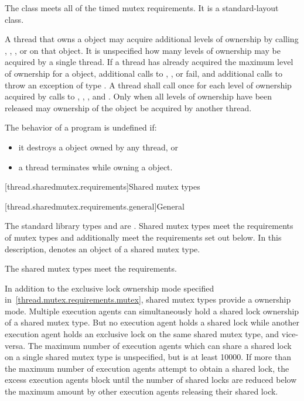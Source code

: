\pnum
The class  meets
all of the timed mutex requirements.
It is a standard-layout class.

\pnum
A thread that owns a  object may acquire additional
levels of ownership by calling , ,
, or  on that object. It is
unspecified how many levels of ownership may be acquired by a single thread. If
a thread has already acquired the maximum level of ownership for a
 object, additional calls to ,
, or  fail, and additional
calls to  throw an exception of type . A
thread shall call  once for each level of ownership acquired by
calls to , , , and
. Only when all levels of ownership have been released
may ownership of the object be acquired by another thread.

\pnum
The behavior of a program is undefined if:
\begin{itemize}
\item it destroys a  object owned by any thread, or
\item a thread terminates while owning a  object.
\end{itemize}


[thread.sharedmutex.requirements]{Shared mutex types}

[thread.sharedmutex.requirements.general]{General}

\pnum
The standard library types  and 
are . Shared mutex types meet the requirements of
mutex types and additionally
meet the requirements set out below. In this description,
 denotes an object of a shared mutex type.
\begin{note}
The shared mutex types meet the 
requirements.
\end{note}

\pnum
{}%
In addition to the exclusive lock ownership mode specified
in~\ref{thread.mutex.requirements.mutex}, shared mutex types provide a
 ownership mode. Multiple execution agents can
simultaneously hold a shared lock ownership of a shared mutex type. But no
execution agent holds a shared lock while another execution agent holds an
exclusive lock on the same shared mutex type, and vice-versa. The maximum
number of execution agents which can share a shared lock on a single shared
mutex type is unspecified, but is at least 10000. If more than the
maximum number of execution agents attempt to obtain a shared lock, the
excess execution agents block until the number of shared locks are
reduced below the maximum amount by other execution agents releasing their
shared lock.

